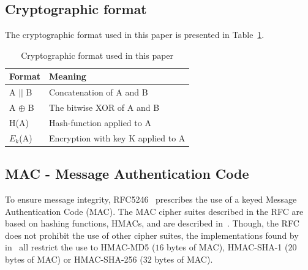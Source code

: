 \documentclass[10pt,conference,a4paper]{IEEEtran}
\begin{document}
\subsection{Cryptographic format}
\label{sec:crypto:format}
The cryptographic format used in this paper is presented in Table~\ref{sec:crypto:format:table}.
\begin{table}[h]
    \begin{tabular}{l|l}
    Format & Meaning \\ \hline
    A $||$ B    & Concatenation of A and B  \\
    A $\oplus$ B  & The bitwise XOR of A and B     \\
    H(A)    & Hash-function applied to A    \\
    $E_k$(A)    & Encryption with key K applied to A    \\
    \end{tabular}
    \caption{Cryptographic format used in this paper}
    \label{sec:crypto:format:table}
\end{table}

\subsection{MAC - Message Authentication Code}
\label{sec:crypto:hmac}
To ensure message integrity, RFC5246~\cite{ietf2008transport} prescribes the use of a keyed Message Authentication Code (MAC). The MAC cipher suites described in the RFC are based on hashing functions, HMACs, and are described in~\cite{krawczyk1997rfc}. Though, the RFC does not prohibit the use of other cipher suites, the implementations found by~\citeauthor{alfardan2013lucky} in~\cite{alfardan2013lucky} all restrict the use to HMAC-MD5 ($16$ bytes of MAC), HMAC-SHA-1 ($20$ bytes of MAC) or HMAC-SHA-256 ($32$ bytes of MAC).
\end{document}
